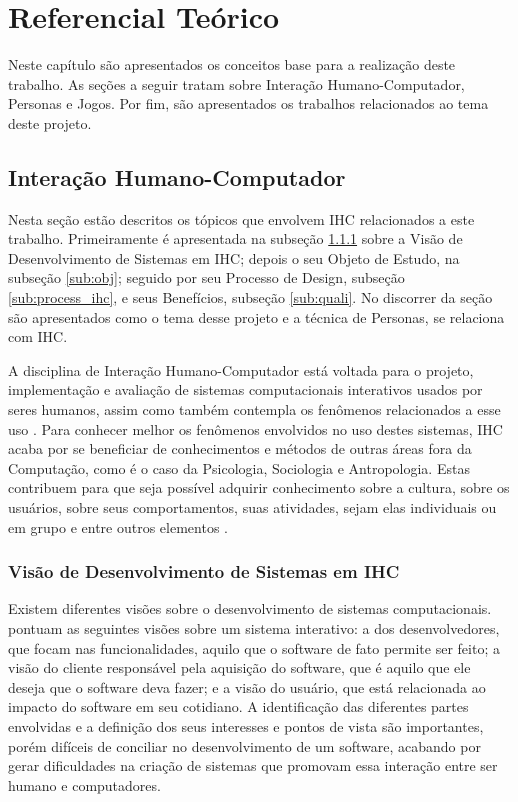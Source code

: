 \chapter{Referencial Teórico}
\label{chap:ref}

Neste capítulo são apresentados os conceitos base para a realização deste trabalho. As seções a seguir tratam sobre Interação Humano-Computador, Personas e Jogos. Por fim, são apresentados os trabalhos relacionados ao tema deste projeto.

\section{Interação Humano-Computador}

Nesta seção estão descritos os tópicos que envolvem IHC relacionados a este trabalho. Primeiramente é apresentada na subseção \ref{sub:visao_ihc} sobre a Visão de  Desenvolvimento de Sistemas em IHC; depois o seu Objeto de Estudo, na subseção \ref{sub:obj}; seguido por seu Processo de Design, subseção \ref{sub:process_ihc}, e seus Benefícios, subseção \ref{sub:quali}. No discorrer da seção são apresentados como o tema desse projeto e a técnica de Personas, se relaciona com IHC.

A disciplina de Interação Humano-Computador está voltada para o projeto, implementação e avaliação de sistemas computacionais interativos usados por seres humanos, assim como também contempla os fenômenos relacionados a esse uso \cite{hewett1992}. Para conhecer melhor os fenômenos envolvidos no uso destes sistemas, IHC acaba por se beneficiar de conhecimentos e métodos de outras áreas fora da Computação, como é o caso da Psicologia, Sociologia e Antropologia. Estas contribuem para que seja possível adquirir conhecimento sobre a cultura, sobre os usuários, sobre seus comportamentos, suas atividades, sejam elas individuais ou em grupo e entre outros elementos \cite[p. 2, 12]{barbosa_silva}.%

\subsection{Visão de Desenvolvimento de Sistemas em IHC}
\label{sub:visao_ihc}
Existem diferentes visões sobre o desenvolvimento de sistemas computacionais.  pontuam as seguintes visões sobre um sistema interativo: a dos desenvolvedores, que focam nas funcionalidades, aquilo que o software de fato permite ser feito; a visão do cliente responsável pela aquisição do software, que é aquilo que ele deseja que o software deva fazer; e a visão do usuário, que está relacionada ao impacto do software em seu cotidiano. A identificação das diferentes partes envolvidas e a definição dos seus interesses e pontos de vista são importantes, porém difíceis de conciliar no desenvolvimento de um software, acabando por gerar dificuldades na criação de sistemas que promovam essa interação entre ser humano e computadores. %

